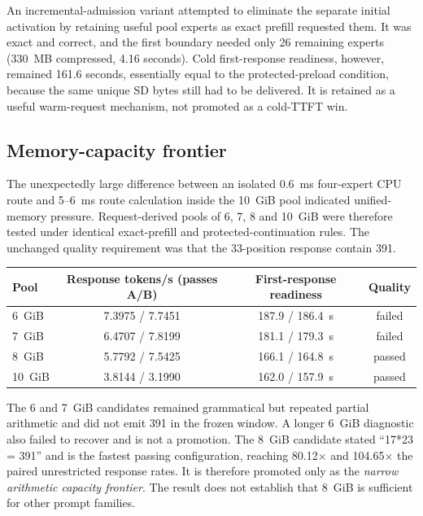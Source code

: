 An incremental-admission variant attempted to eliminate the separate initial
activation by retaining useful pool experts as exact prefill requested them.
It was exact and correct, and the first boundary needed only 26 remaining
experts (330~MB compressed, 4.16 seconds).  Cold first-response readiness,
however, remained 161.6 seconds, essentially equal to the protected-preload
condition, because the same unique SD bytes still had to be delivered.  It is
retained as a useful warm-request mechanism, not promoted as a cold-TTFT win.

\subsection{Memory-capacity frontier}

The unexpectedly large difference between an isolated 0.6~ms four-expert CPU
route and 5--6~ms route calculation inside the 10~GiB pool indicated unified-
memory pressure.  Request-derived pools of 6, 7, 8 and 10~GiB were therefore
tested under identical exact-prefill and protected-continuation rules.  The
unchanged quality requirement was that the 33-position response contain 391.

\begin{center}
\begin{tabular}{@{}lccc@{}}
\toprule
Pool & Response tokens/s (passes A/B) & First-response readiness & Quality \\
\midrule
6~GiB & 7.3975 / 7.7451 & 187.9 / 186.4~s & failed \\
7~GiB & 6.4707 / 7.8199 & 181.1 / 179.3~s & failed \\
8~GiB & 5.7792 / 7.5425 & 166.1 / 164.8~s & passed \\
10~GiB & 3.8144 / 3.1990 & 162.0 / 157.9~s & passed \\
\bottomrule
\end{tabular}
\end{center}

The 6 and 7~GiB candidates remained grammatical but repeated partial arithmetic
and did not emit 391 in the frozen window.  A longer 6~GiB diagnostic also
failed to recover and is not a promotion.  The 8~GiB candidate stated
``17*23 = 391'' and is the fastest passing configuration, reaching 80.12$\times$
and 104.65$\times$ the paired unrestricted response rates.  It is therefore
promoted only as the \emph{narrow arithmetic capacity frontier}.  The result
does not establish that 8~GiB is sufficient for other prompt families.

